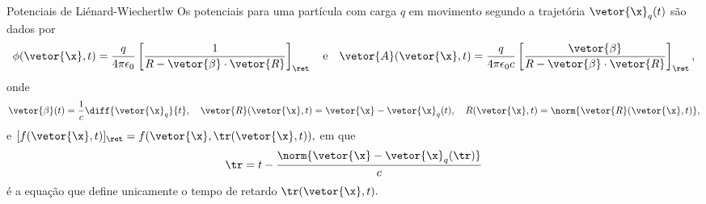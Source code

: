 \begin{theorem}{Potenciais de Liénard-Wiechert}{lw}
   Os potenciais para uma partícula com carga \(q\) em movimento segundo a trajetória \(\vetor{\x}_q(t)\) são dados por
   \begin{equation*}
      \phi(\vetor{\x}, t) = \frac{q}{4\pi \epsilon_0}\left[\frac{1}{R - \vetor{\beta} \cdot \vetor{R}}\right]_{\ret}
      \quad\text{e}\quad
      \vetor{A}(\vetor{\x}, t) = \frac{q}{4\pi \epsilon_0 c}\left[\frac{\vetor{\beta}}{R - \vetor{\beta}\cdot \vetor{R}}\right]_{\ret},
   \end{equation*}
   onde
   \begin{equation*}
      \vetor{\beta}(t) = \frac1c \diff{\vetor{\x}_q}{t},\quad
      \vetor{R}(\vetor{\x},t) = \vetor{\x} - \vetor{\x}_q(t),\quad
      R(\vetor{\x}, t) = \norm{\vetor{R}(\vetor{\x}, t)},
   \end{equation*}
   e \([f(\vetor{\x}, t)]_\ret = f(\vetor{\x}, \tr(\vetor{\x}, t)),\) em que 
   \begin{equation*}
      \tr = t - \frac{\norm{\vetor{\x} - \vetor{\x}_q(\tr)}}{c}
   \end{equation*}
   é a equação que define unicamente o tempo de retardo \(\tr(\vetor{\x}, t).\)
\end{theorem}
